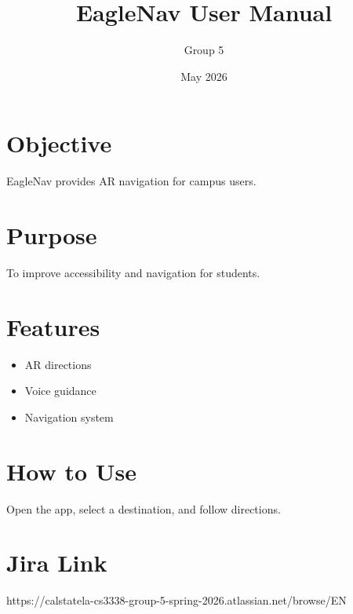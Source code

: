 \documentclass{article}
\title{EagleNav User Manual}
\author{Group 5}
\date{May 2026}
\begin{document}
\maketitle

\section{Objective}
EagleNav provides AR navigation for campus users.

\section{Purpose}
To improve accessibility and navigation for students.

\section{Features}
\begin{itemize}
\item AR directions
\item Voice guidance
\item Navigation system
\end{itemize}

\section{How to Use}
Open the app, select a destination, and follow directions.

\section{Jira Link}
https://calstatela-cs3338-group-5-spring-2026.atlassian.net/browse/EN
\end{document}
